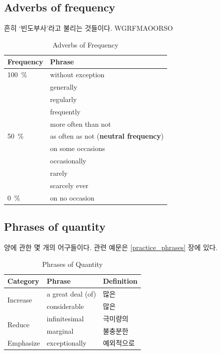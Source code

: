 \documentclass[10pt]{report}
\begin{document}
	\subsection{Adverbs of frequency}
	흔히 `빈도부사'라고 불리는 것들이다. WGRFMAOORSO
	\begin{table}[ht!]
		\centering
		\begin{tabular}{|l|l|}
			\hline
			Frequency & Phrase \\ \hline
			100~\%         &   without exception     \\ \hline
			&   generally     \\ \hline
			&   regularly    \\ \hline
			&   frequently     \\ \hline
			&   more often than not     \\ \hline
			50~\%      &   as often as not ({\bf neutral frequency})\\ \hline
			&   on some occasions     \\ \hline
			&   occasionally     \\ \hline
			&   rarely    \\ \hline
			&   scarcely ever     \\ \hline
			0~\%       &   on no occasion     \\ \hline
		\end{tabular}
		\caption{Adverbs of Frequency}
		\label{adverbs_of_frequency}
	\end{table}
	\clearpage
	\subsection{Phrases of quantity}
	양에 관한 몇 개의 어구들이다. 관련 예문은 \ref{practice_phrases} 장에 있다.
	\begin{table}[ht!]
		\centering
		\begin{tabular}{|l|l|l|}
			\hline
			Category                  & Phrase          &  Definition   \\ \hline
			\multirow{2}{*}{Increase} & a great deal (of) & 많은 \\ \cline{2-3} 
			& considerable & 많은      \\ \hline
			\multirow{2}{*}{Reduce}   & infinitesimal & 극미량의   \\ \cline{2-3} 
			& marginal   & 불충분한      \\ \hline
			Emphasize                 & exceptionally & 예외적으로     \\ \hline
		\end{tabular}
		\caption{Phrases of Quantity}
		\label{phrases_of_quantity}
	\end{table}
	
\end{document}
